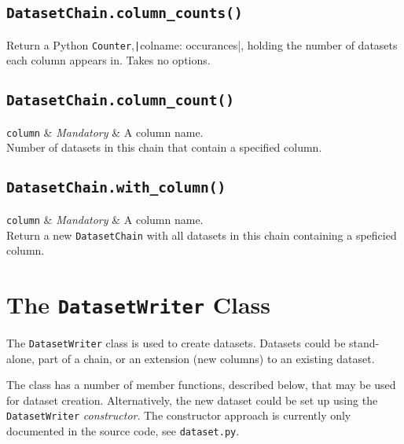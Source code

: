 \subsection{\texttt{DatasetChain.column\_counts()}}
Return a Python \texttt{Counter},\texttt|{colname:
occurances}|, holding the number of datasets each column appears in.
Takes no options.


\subsection{\texttt{DatasetChain.column\_count()}}
\starttable
\texttt{column} & \textsl{Mandatory} & A column name.\\
\stoptable
Number of datasets in this chain that contain a specified column.


\subsection{\texttt{DatasetChain.with\_column()}}
\starttable
\texttt{column} & \textsl{Mandatory} & A column name.\\
\stoptable
Return a new \texttt{DatasetChain} with all datasets in this chain
containing a speficied column.



\clearpage
\section{The \texttt{DatasetWriter} Class}
\label{sec:classes:datasetwriter}
The \texttt{DatasetWriter} class is used to create datasets.  Datasets
could be stand-alone, part of a chain, or an extension (new columns)
to an existing dataset.

The class has a number of member functions, described below, that may
be used for dataset creation.  Alternatively, the new dataset could be
set up using the \texttt{DatasetWriter} \textsl{constructor}.  The
constructor approach is currently only documented in the source code,
see \texttt{dataset.py}.

